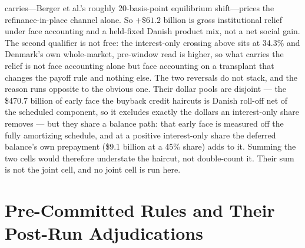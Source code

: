 \documentclass[12pt]{article}
\begin{document}
carries---Berger et al.'s roughly 20-basis-point equilibrium shift---prices the refinance-in-place channel alone. So $+\$61.2$ billion is gross institutional relief under face accounting and a held-fixed Danish product mix, not a net social gain. The second qualifier is not free: the interest-only crossing above sits at 34.3\% and Denmark's own whole-market, pre-window read is higher, so what carries the relief is not face accounting alone but face accounting on a transplant that changes the payoff rule and nothing else. The two reversals do not stack, and the reason runs opposite to the obvious one. Their dollar pools are disjoint --- the \$470.7 billion of early face the buyback credit haircuts is Danish roll-off net of the scheduled component, so it excludes exactly the dollars an interest-only share removes --- but they share a balance path: that early face is measured off the fully amortizing schedule, and at a positive interest-only share the deferred balance's own prepayment (\$9.1 billion at a 45\% share) adds to it. Summing the two cells would therefore understate the haircut, not double-count it. Their sum is not the joint cell, and no joint cell is run here.

\section{Pre-Committed Rules and Their Post-Run Adjudications}\label{app:verdicts}
\end{document}
